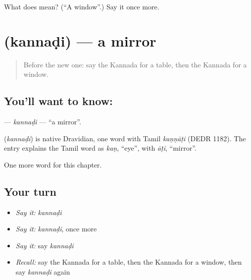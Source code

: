 \begin{tcolorbox}[breakable,colback=teal!4,colframe=teal!35!black,title={Before you move on}]
What does  mean? (\textquotedblleft{}A window\textquotedblright{}.) Say it once more.
\end{tcolorbox}
\section[\texorpdfstring{\kn{ಕನ್ನಡಿ} (kannaḍi)}{ಕನ್ನಡಿ (kannaḍi)}]{ (kannaḍi) — a mirror}

\label{lesson:KA-C137-kannadi}



\begin{quote}
Before the new one: say the Kannada for a table, then the Kannada for a window.
\end{quote}

\subsection*{You'll want to know: }
\textbf{} — \emph{kannaḍi} — \textquotedblleft{}a mirror\textquotedblright{}.

\begin{cousinweb}
\textbf{} (\emph{kannaḍi}) is native Dravidian, one word with Tamil \emph{kaṇṇāṭi} (DEDR 1182). The entry explains the Tamil word as \emph{kaṇ}, \textquotedblleft{}eye\textquotedblright{}, with \emph{āṭi}, \textquotedblleft{}mirror\textquotedblright{}.
\end{cousinweb}

\begin{grammarlens}[title={What you've built}]
One more word for this chapter.
\end{grammarlens}

\subsection*{Your turn}
\begin{itemize}
\raggedright
  \item \emph{Say it:} \emph{kannaḍi}
  \item \emph{Say it:} \emph{kannaḍi}, once more
  \item \emph{Say it:} say \emph{kannaḍi}
  \item \emph{Recall:} say the Kannada for a table, then the Kannada for a window, then say \emph{kannaḍi} again
\end{itemize}

